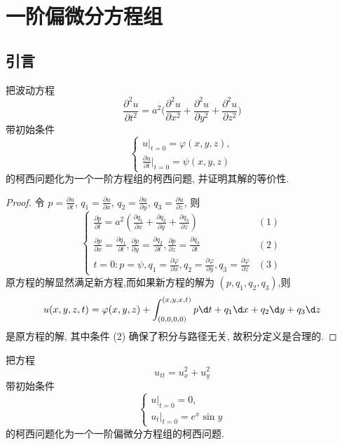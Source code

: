 \chapter{一阶偏微分方程组}

\section{引言}

\begin{exercise}
  把波动方程
  \[\frac{\partial^2u}{\partial t^2} = a^2 
    \biggl(\frac{\partial^2u}{\partial x^2} + \frac{\partial^2u}{\partial y^2}
    + \frac{\partial^2u}{\partial z^2}\biggr)\]
  带初始条件
  \[\begin{cases}
    u|_{t=0} = \varphi(x,y,z), \\
    \frac{\partial u}{\partial t}|_{t=0} = \psi(x,y,z)
  \end{cases}\]
  的柯西问题化为一个一阶方程组的柯西问题, 并证明其解的等价性.
\end{exercise}

\begin{proof}
  令 $p=\frac{\partial u}{\partial t}$, $q_1=\frac{\partial u}{\partial x}$,
  $q_2=\frac{\partial u}{\partial y}$, $q_3=\frac{\partial u}{\partial z}$, 则
  \[\begin{cases}
    \frac{\partial p}{\partial t} = a^2\left(\frac{\partial q_1}{\partial x}
      +\frac{\partial q_2}{\partial y}+\frac{\partial q_3}{\partial z}\right) & (1) \\
    \frac{\partial p}{\partial x} = \frac{\partial q_1}{\partial t},
    \frac{\partial p}{\partial y}=\frac{\partial q_2}{\partial t},
    \frac{\partial p}{\partial z}=\frac{\partial q_3}{\partial t} & (2) \\
    t = 0: p=\psi, q_1 = \frac{\partial\varphi}{\partial x},
                   q_2 = \frac{\partial\varphi}{\partial y},
                   q_3 = \frac{\partial\varphi}{\partial z} & (3)
  \end{cases}\]
  原方程的解显然满足新方程,而如果新方程的解为 $(p,q_1,q_2,q_3)$,则
  \[u(x,y,z,t) = \varphi(x,y,z)
    + \int_{(0,0,0,0)}^{(x,y,x,t)}p\d t+q_1\d x+q_2\d y+q_3\d z\]
  是原方程的解, 其中条件 (2) 确保了积分与路径无关, 故积分定义是合理的.
\end{proof}


\begin{exercise}
  把方程
  \[ u_{tt} = u_{x}^2 + u_{y}^2 \]
  带初始条件
  \[\begin{cases}
    u|_{t=0} = 0, \\
    u_t|_{t=0} = e^x \sin y
  \end{cases}\]
  的柯西问题化为一个一阶偏微分方程组的柯西问题.
\end{exercise}

